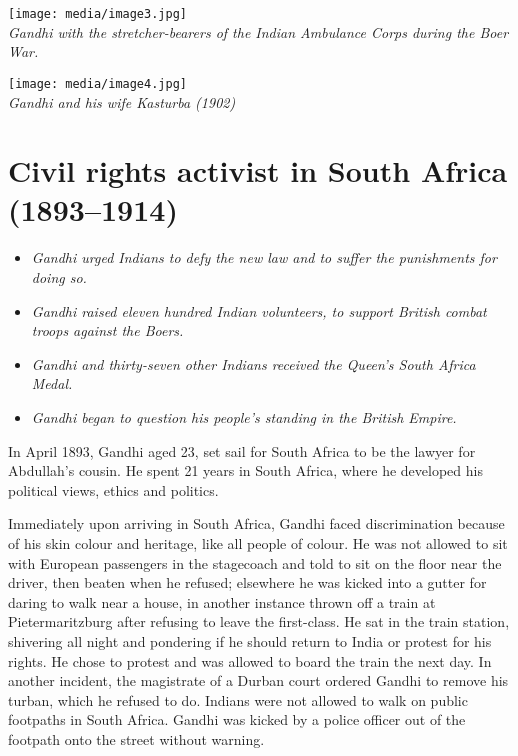 \texttt{[image: media/image3.jpg]}\\
\emph{Gandhi with the stretcher-bearers of the Indian Ambulance Corps
during the Boer War.}

\texttt{[image: media/image4.jpg]}\\
\emph{Gandhi and his wife Kasturba (1902)}

\section{Civil rights activist in South Africa
(1893--1914)}\label{civil-rights-activist-in-south-africa-18931914}

\begin{itemize}
\item
  \emph{Gandhi urged Indians to defy the new law and to suffer the
  punishments for doing so.}
\item
  \emph{Gandhi raised eleven hundred Indian volunteers, to support
  British combat troops against the Boers.}
\item
  \emph{Gandhi and thirty-seven other Indians received the Queen's South
  Africa Medal.}
\item
  \emph{Gandhi began to question his people's standing in the British
  Empire.}
\end{itemize}

In April 1893, Gandhi aged 23, set sail for South Africa to be the
lawyer for Abdullah's cousin. He spent 21 years in South Africa, where
he developed his political views, ethics and politics.

Immediately upon arriving in South Africa, Gandhi faced discrimination
because of his skin colour and heritage, like all people of colour. He
was not allowed to sit with European passengers in the stagecoach and
told to sit on the floor near the driver, then beaten when he refused;
elsewhere he was kicked into a gutter for daring to walk near a house,
in another instance thrown off a train at Pietermaritzburg after
refusing to leave the first-class. He sat in the train station,
shivering all night and pondering if he should return to India or
protest for his rights. He chose to protest and was allowed to board the
train the next day. In another incident, the magistrate of a Durban
court ordered Gandhi to remove his turban, which he refused to do.
Indians were not allowed to walk on public footpaths in South Africa.
Gandhi was kicked by a police officer out of the footpath onto the
street without warning.

